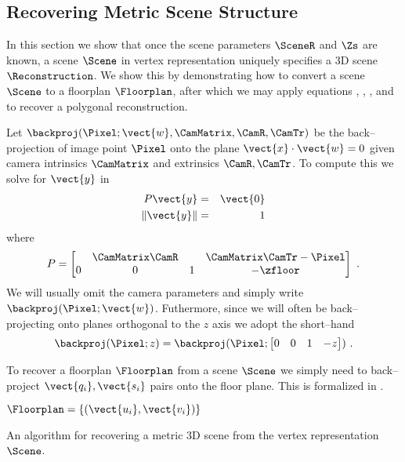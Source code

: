 \subsection{Recovering Metric Scene Structure}
\label{sec:metric-recovery}

In this section we show that once the scene parameters $\SceneR$ and
$\Zs$ are known, a scene $\Scene$ in vertex representation uniquely
specifies a 3D scene $\Reconstruction$. We show this by demonstrating
how to convert a scene $\Scene$ to a floorplan $\Floorplan$, after
which we may apply equations ,
, , and
 to recover a polygonal reconstruction. 

Let $\backproj(\Pixel;\vect{w},\CamMatrix,\CamR,\CamTr)$ be the
back--projection of image point $\Pixel$ onto the plane
$\vect{x}\cdot\vect{w}=0$ given camera intrinsics $\CamMatrix$ and
extrinsics $\CamR,\CamTr$. To compute this we solve for $\vect{y}$ in
\begin{eqnarray}
  P \vect{y} &=& \vect{0}\\
  \| \vect{y} \| &=& 1
\end{eqnarray}
where
\begin{equation}
  P =
  \begin{bmatrix}
    & \CamMatrix\CamR & & \CamMatrix\CamTr-\Pixel \\
    0 & 0 & 1 & -\zfloor
  \end{bmatrix}~.
\end{equation}
We will usually omit the camera parameters and simply write
$\backproj(\Pixel;\vect{w})$. Futhermore, since we will often be
back--projecting onto planes orthogonal to the $z$ axis we adopt the
short--hand
\begin{equation}
  \backproj(\Pixel;z) = \backproj(\Pixel;
    \begin{bmatrix}0 & 0 & 1 & -z\end{bmatrix}) ~.
\end{equation}

To recover a floorplan $\Floorplan$ from a scene $\Scene$
we simply need to back--project $\vect{q_i},\vect{s_i}$ pairs onto
the floor plane. This is formalized in .

\begin{algorithm}
  \label{alg:scene-to-recon}
      \begin{algorithmic}
        \ENSURE $\Floorplan=\{(\vect{u_i},\vect{v_i})\}$
        \STATE{$\Floorplan \leftarrow \emptyset$}
        \ENDFOR
      \end{algorithmic}
  \caption{An algorithm for recovering a metric 3D scene from the
    vertex representation $\Scene$.}
\end{algorithm}


